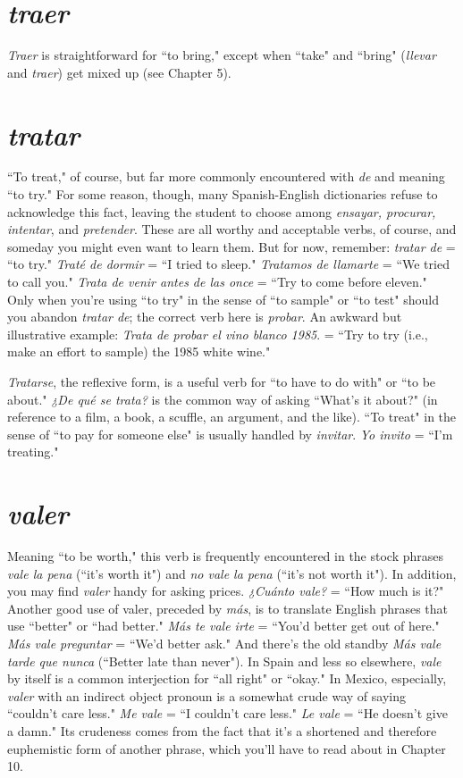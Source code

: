 \section{\emph{traer}}

\emph{Traer} is straightforward for ``to bring," except when ``take"
and ``bring" (\emph{llevar} and \emph{traer}) get mixed up (see Chapter 5).

\section{\emph{tratar}}

``To treat," of course, but far more commonly encountered
with \emph{de} and meaning ``to try." For some reason, though, many Spanish-English dictionaries refuse to acknowledge this fact, leaving the student to choose among \emph{ensayar, procurar, intentar}, and \emph{pretender}.
These are all worthy and acceptable verbs, of course, and someday you
might even want to learn them. But for now, remember: \emph{tratar de} =
``to try." \emph{Traté de dormir} = ``I tried to sleep." \emph{Tratamos de llamarte}
= ``We tried to call you." \emph{Trata de venir antes de las once} = ``Try to
come before eleven." Only when you're using ``to try" in the sense of
``to sample" or ``to test" should you abandon \emph{tratar de}; the correct verb
here is \emph{probar}. An awkward but illustrative example: \emph{Trata de probar
	el vino blanco 1985}. = ``Try to try (i.e., make an effort to sample) the
1985 white wine."

\emph{Tratarse}, the reflexive form, is a useful verb for ``to have to do
with" or ``to be about." \emph{¿De qué se trata?} is the common way of asking
``What's it about?" (in reference to a film, a book, a scuffle, an argument, and the like). ``To treat" in the sense of ``to pay for someone
else" is usually handled by \emph{invitar}. \emph{Yo invito} = ``I'm treating."

\section{\emph{valer}}

Meaning ``to be worth," this verb is frequently encountered
in the stock phrases \emph{vale la pena} (``it's worth it") and \emph{no vale la pena}
(``it's not worth it"). In addition, you may find \emph{valer} handy for asking
prices. \emph{¿Cuánto vale?} = ``How much is it?" Another good use of valer,
preceded by \emph{más}, is to translate English phrases that use ``better" or
``had better." \emph{Más te vale irte} = ``You'd better get out of here." \emph{Más
	vale preguntar} = ``We'd better ask." And there's the old standby \emph{Más
	vale tarde que nunca} (``Better late than never"). In Spain and less so
elsewhere, \emph{vale} by itself is a common interjection for ``all right" or
``okay." In Mexico, especially, \emph{valer} with an indirect object pronoun
is a somewhat crude way of saying ``couldn't care less." \emph{Me vale} = ``I
couldn't care less." \emph{Le vale} = ``He doesn't give a damn." Its crudeness
comes from the fact that it's a shortened and therefore euphemistic
form of another phrase, which you'll have to read about in Chapter 10.

